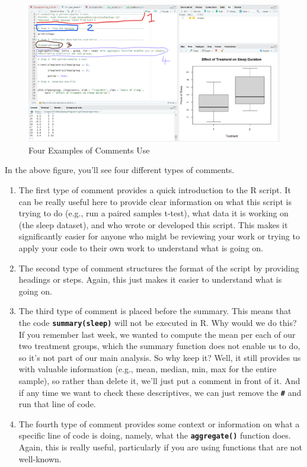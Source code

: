 \documentclass[
]{book}
\begin{document}
\begin{figure}
\centering
\includegraphics{img/03-comments.png}
\caption{\label{fig:unnamed-chunk-27}Four Examples of Comments Use}
\end{figure}

In the above figure, you'll see four different types of comments.

\begin{enumerate}
\def\labelenumi{\arabic{enumi}.}
\item
  The first type of comment provides a quick introduction to the R script. It can be really useful here to provide clear information on what this script is trying to do (e.g., run a paired samples t-test), what data it is working on (the sleep dataset), and who wrote or developed this script. This makes it significantly easier for anyone who might be reviewing your work or trying to apply your code to their own work to understand what is going on.
\item
  The second type of comment structures the format of the script by providing headings or steps. Again, this just makes it easier to understand what is going on.
\item
  The third type of comment is placed before the summary. This means that the code \textbf{\texttt{summary(sleep)}} will not be executed in R. Why would we do this? If you remember last week, we wanted to compute the mean per each of our two treatment groups, which the summary function does not enable us to do, so it's not part of our main analysis. So why keep it? Well, it still provides us with valuable information (e.g., mean, median, min, max for the entire sample), so rather than delete it, we'll just put a comment in front of it. And if any time we want to check these descriptives, we can just remove the \textbf{\texttt{\#}} and run that line of code.
\item
  The fourth type of comment provides some context or information on what a specific line of code is doing, namely, what the \textbf{\texttt{aggregate()}} function does. Again, this is really useful, particularly if you are using functions that are not well-known.
\end{enumerate}
\end{document}
